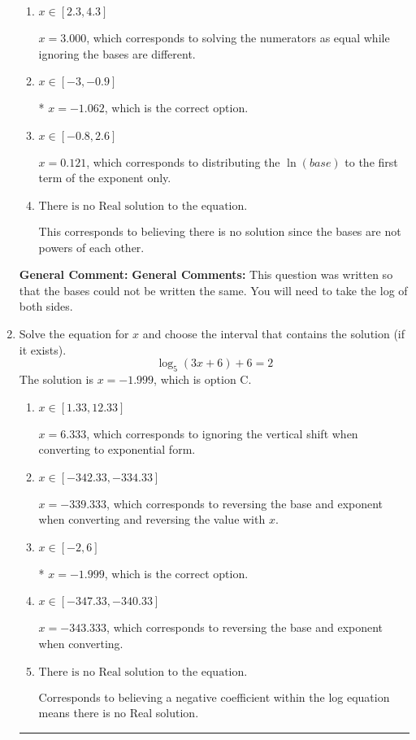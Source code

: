 \documentclass{extbook}[14pt]
\newcommand{\litem}[1]{\item #1

\rule{\textwidth}{0.4pt}}
\begin{document}
\begin{enumerate}
{\begin{enumerate}[label=\Alph*.]
$x = -26.339$, which corresponds to distributing the $\ln(base)$ to the second term of the exponent only.
\item \( x \in [2.3, 4.3] \)

$x = 3.000$, which corresponds to solving the numerators as equal while ignoring the bases are different.
\item \( x \in [-3, -0.9] \)

* $x = -1.062$, which is the correct option.
\item \( x \in [-0.8, 2.6] \)

$x = 0.121$, which corresponds to distributing the $\ln(base)$ to the first term of the exponent only.
\item \( \text{There is no Real solution to the equation.} \)

This corresponds to believing there is no solution since the bases are not powers of each other.
\end{enumerate}

\textbf{General Comment:} \textbf{General Comments:} This question was written so that the bases could not be written the same. You will need to take the log of both sides.
}
\litem{
Solve the equation for $x$ and choose the interval that contains the solution (if it exists).
\[ \log_{5}{(3x+6)}+6 = 2 \]The solution is \( x = -1.999 \), which is option C.\begin{enumerate}[label=\Alph*.]
\item \( x \in [1.33, 12.33] \)

$x = 6.333$, which corresponds to ignoring the vertical shift when converting to exponential form.
\item \( x \in [-342.33, -334.33] \)

$x = -339.333$, which corresponds to reversing the base and exponent when converting and reversing the value with $x$.
\item \( x \in [-2, 6] \)

* $x = -1.999$, which is the correct option.
\item \( x \in [-347.33, -340.33] \)

$x = -343.333$, which corresponds to reversing the base and exponent when converting.
\item \( \text{There is no Real solution to the equation.} \)

Corresponds to believing a negative coefficient within the log equation means there is no Real solution.
\end{enumerate}

}
\end{enumerate}
\end{document}
